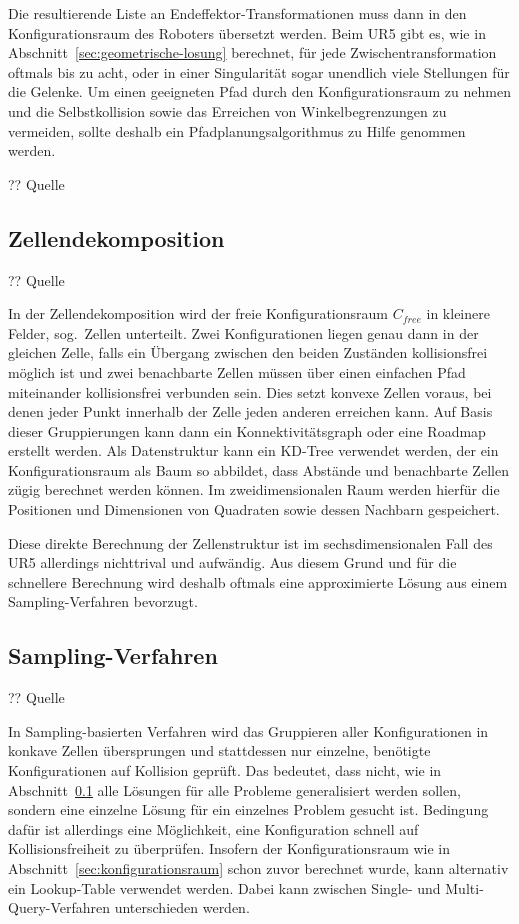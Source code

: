 Die resultierende Liste an Endeffektor-Transformationen muss dann in den Konfigurationsraum des Roboters übersetzt werden.
Beim UR5 gibt es, wie in Abschnitt~\ref{sec:geometrische-losung} berechnet, für jede Zwischentransformation oftmals bis zu acht, oder in einer Singularität sogar unendlich viele Stellungen für die Gelenke.
Um einen geeigneten Pfad durch den Konfigurationsraum zu nehmen und die Selbstkollision sowie das Erreichen von Winkelbegrenzungen zu vermeiden, sollte deshalb ein Pfadplanungsalgorithmus zu Hilfe genommen werden.

?? Quelle

\subsection{Zellendekomposition}\label{subsec:zellendekomposition}
?? Quelle

In der Zellendekomposition wird der freie Konfigurationsraum $C_{free}$ in kleinere Felder, sog.\ Zellen unterteilt.
Zwei Konfigurationen liegen genau dann in der gleichen Zelle, falls ein Übergang zwischen den beiden Zuständen kollisionsfrei möglich ist und zwei benachbarte Zellen müssen über einen einfachen Pfad miteinander kollisionsfrei verbunden sein.
Dies setzt konvexe Zellen voraus, bei denen jeder Punkt innerhalb der Zelle jeden anderen erreichen kann.
Auf Basis dieser Gruppierungen kann dann ein Konnektivitätsgraph oder eine Roadmap erstellt werden.
Als Datenstruktur kann ein KD-Tree verwendet werden, der ein Konfigurationsraum als Baum so abbildet, dass Abstände und benachbarte Zellen zügig berechnet werden können.
Im zweidimensionalen Raum werden hierfür die Positionen und Dimensionen von Quadraten sowie dessen Nachbarn gespeichert.

Diese direkte Berechnung der Zellenstruktur ist im sechsdimensionalen Fall des UR5 allerdings nichttrival und aufwändig.
Aus diesem Grund und für die schnellere Berechnung wird deshalb oftmals eine approximierte Lösung aus einem Sampling-Verfahren bevorzugt.

\subsection{Sampling-Verfahren}
?? Quelle

In Sampling-basierten Verfahren wird das Gruppieren aller Konfigurationen in konkave Zellen übersprungen und stattdessen nur einzelne, benötigte Konfigurationen auf Kollision geprüft.
Das bedeutet, dass nicht, wie in Abschnitt~\ref{subsec:zellendekomposition} alle Lösungen für alle Probleme generalisiert werden sollen, sondern eine einzelne Lösung für ein einzelnes Problem gesucht ist.
Bedingung dafür ist allerdings eine Möglichkeit, eine Konfiguration schnell auf Kollisionsfreiheit zu überprüfen.
Insofern der Konfigurationsraum wie in Abschnitt~\ref{sec:konfigurationsraum} schon zuvor berechnet wurde, kann alternativ ein Lookup-Table verwendet werden.
Dabei kann zwischen Single- und Multi-Query-Verfahren unterschieden werden.


